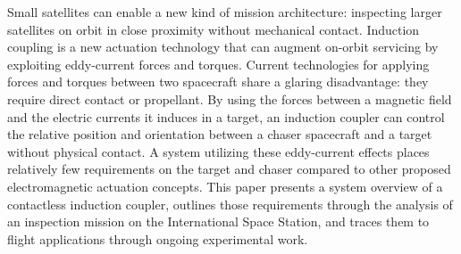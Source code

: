 Small satellites can enable a new kind of mission architecture: inspecting larger satellites on orbit in close proximity without mechanical contact. Induction coupling is a new actuation technology that can augment on-orbit servicing by exploiting eddy-current forces and torques. Current technologies for applying forces and torques between two spacecraft share a glaring disadvantage: they require direct contact or propellant. By using the forces between a magnetic field and the electric currents it induces in a target, an induction coupler can control the relative position and orientation between a chaser spacecraft and a target without physical contact. A system utilizing these eddy-current effects places relatively few requirements on the target and chaser compared to other proposed electromagnetic actuation concepts. This paper presents a system overview of a contactless induction coupler, outlines those requirements through the analysis of an inspection mission on the International Space Station, and traces them to flight applications through ongoing experimental work.
